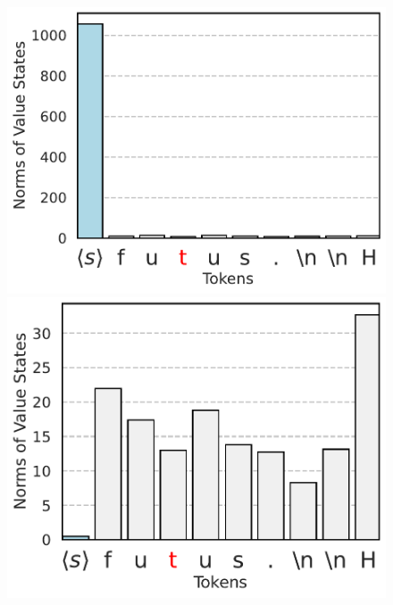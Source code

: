 \begin{figure}[t]
  \centering
  \begin{minipage}{0.3\textwidth}
      \centering
      \vspace{-.2em}
      \includegraphics[width=\linewidth]{Figures/BBM_appendix/value_states_layer_0.pdf}
  \end{minipage}
  \begin{minipage}{0.3\textwidth}
      \centering
      \vspace{-.2em}
      \includegraphics[width=\linewidth]{Figures/BBM_appendix/value_states_layer_1.pdf}

\end{minipage}
\end{figure}
